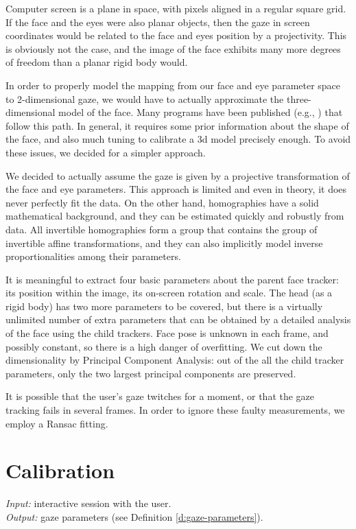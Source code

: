 Computer screen is a plane in space, with pixels aligned in a regular square grid.
If the face and the eyes were also planar objects, then the gaze in screen coordinates would be related to the face and eyes position by a projectivity.
This is obviously not the case, and the image of the face exhibits many more degrees of freedom than a planar rigid body would.
 
In order to properly model the mapping from our face and eye parameter space to 2-dimensional gaze, we would have to actually approximate the three-dimensional model of the face.
Many programs have been published (e.g., \cite{fanelli11}) that follow this path.
In general, it requires some prior information about the shape of the face, and also much tuning to calibrate a 3d model precisely enough.
To avoid these issues, we decided for a simpler approach.

We decided to actually assume the gaze is given by a projective transformation of the face and eye parameters.
This approach is limited and even in theory, it does never perfectly fit the data.
On the other hand, homographies have a solid mathematical background, and they can be estimated quickly and robustly from data.
All invertible homographies form a group that contains the group of invertible affine transformations, and they can also implicitly model inverse proportionalities among their parameters.

It is meaningful to extract four basic parameters about the parent face tracker: its position within the image, its on-screen rotation and scale.
The head (as a rigid body) has two more parameters to be covered, but there is a virtually unlimited number of extra parameters that can be obtained by a detailed analysis of the face using the child trackers.
Face pose is unknown in each frame, and possibly constant, so there is a high danger of overfitting.
We cut down the dimensionality by Principal Component Analysis: out of the all the child tracker parameters, only the two largest principal components are preserved.

It is possible that the user's gaze twitches for a moment, or that the gaze tracking fails in several frames.
In order to ignore these faulty measurements, we employ a Ransac fitting.

\section{Calibration}

\textit{Input:} interactive session with the user.\\
\textit{Output:} gaze parameters (see Definition \ref{d:gaze-parameters}).\\

